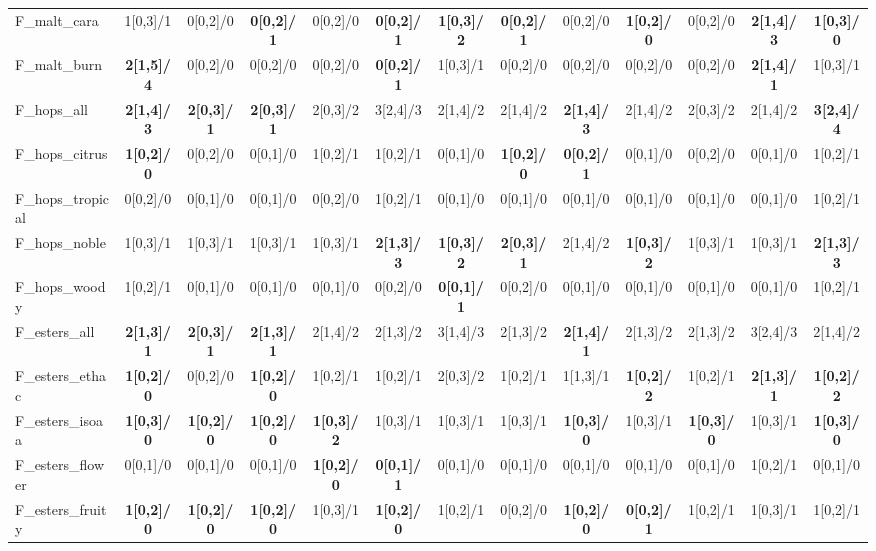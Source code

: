 \begin{landscape}
\begin{longtable}{lcccccccccccc}
F\_malt\_cara & 1[0,3]/1 & 0[0,2]/0 & \textbf{0[0,2]/1} & 0[0,2]/0 & \textbf{0[0,2]/1} & \textbf{1[0,3]/2} & \textbf{0[0,2]/1} & 0[0,2]/0 & \textbf{1[0,2]/0} & 0[0,2]/0 & \textbf{2[1,4]/3} & \textbf{1[0,3]/0} \\
F\_malt\_burn & \textbf{2[1,5]/4} & 0[0,2]/0 & 0[0,2]/0 & 0[0,2]/0 & \textbf{0[0,2]/1} & 1[0,3]/1 & 0[0,2]/0 & 0[0,2]/0 & 0[0,2]/0 & 0[0,2]/0 & \textbf{2[1,4]/1} & 1[0,3]/1 \\
F\_hops\_all & \textbf{2[1,4]/3} & \textbf{2[0,3]/1} & \textbf{2[0,3]/1} & 2[0,3]/2 & 3[2,4]/3 & 2[1,4]/2 & 2[1,4]/2 & \textbf{2[1,4]/3} & 2[1,4]/2 & 2[0,3]/2 & 2[1,4]/2 & \textbf{3[2,4]/4} \\
F\_hops\_citrus & \textbf{1[0,2]/0} & 0[0,2]/0 & 0[0,1]/0 & 1[0,2]/1 & 1[0,2]/1 & 0[0,1]/0 & \textbf{1[0,2]/0} & \textbf{0[0,2]/1} & 0[0,1]/0 & 0[0,2]/0 & 0[0,1]/0 & 1[0,2]/1 \\
F\_hops\_tropical & 0[0,2]/0 & 0[0,1]/0 & 0[0,1]/0 & 0[0,2]/0 & 1[0,2]/1 & 0[0,1]/0 & 0[0,1]/0 & 0[0,1]/0 & 0[0,1]/0 & 0[0,1]/0 & 0[0,1]/0 & 1[0,2]/1 \\
F\_hops\_noble & 1[0,3]/1 & 1[0,3]/1 & 1[0,3]/1 & 1[0,3]/1 & \textbf{2[1,3]/3} & \textbf{1[0,3]/2} & \textbf{2[0,3]/1} & 2[1,4]/2 & \textbf{1[0,3]/2} & 1[0,3]/1 & 1[0,3]/1 & \textbf{2[1,3]/3} \\
F\_hops\_woody & 1[0,2]/1 & 0[0,1]/0 & 0[0,1]/0 & 0[0,1]/0 & 0[0,2]/0 & \textbf{0[0,1]/1} & 0[0,2]/0 & 0[0,1]/0 & 0[0,1]/0 & 0[0,1]/0 & 0[0,1]/0 & 1[0,2]/1 \\
F\_esters\_all & \textbf{2[1,3]/1} & \textbf{2[0,3]/1} & \textbf{2[1,3]/1} & 2[1,4]/2 & 2[1,3]/2 & 3[1,4]/3 & 2[1,3]/2 & \textbf{2[1,4]/1} & 2[1,3]/2 & 2[1,3]/2 & 3[2,4]/3 & 2[1,4]/2 \\
F\_esters\_ethac & \textbf{1[0,2]/0} & 0[0,2]/0 & \textbf{1[0,2]/0} & 1[0,2]/1 & 1[0,2]/1 & 2[0,3]/2 & 1[0,2]/1 & 1[1,3]/1 & \textbf{1[0,2]/2} & 1[0,2]/1 & \textbf{2[1,3]/1} & \textbf{1[0,2]/2} \\
F\_esters\_isoaa & \textbf{1[0,3]/0} & \textbf{1[0,2]/0} & \textbf{1[0,2]/0} & \textbf{1[0,3]/2} & 1[0,3]/1 & 1[0,3]/1 & 1[0,3]/1 & \textbf{1[0,3]/0} & 1[0,3]/1 & \textbf{1[0,3]/0} & 1[0,3]/1 & \textbf{1[0,3]/0} \\
F\_esters\_flower & 0[0,1]/0 & 0[0,1]/0 & 0[0,1]/0 & \textbf{1[0,2]/0} & \textbf{0[0,1]/1} & 0[0,1]/0 & 0[0,1]/0 & 0[0,1]/0 & 0[0,1]/0 & 0[0,1]/0 & 1[0,2]/1 & 0[0,1]/0 \\
F\_esters\_fruity & \textbf{1[0,2]/0} & \textbf{1[0,2]/0} & \textbf{1[0,2]/0} & 1[0,3]/1 & \textbf{1[0,2]/0} & 1[0,2]/1 & 0[0,2]/0 & \textbf{1[0,2]/0} & \textbf{0[0,2]/1} & 1[0,2]/1 & 1[0,3]/1 & 1[0,2]/1 \\
\end{longtable}
\end{landscape}


